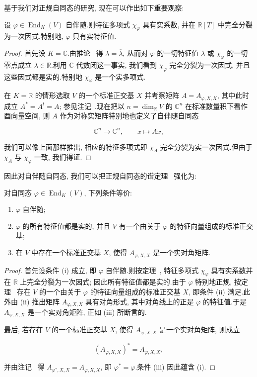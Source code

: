 基于我们对正规自同态的研究, 现在可以作出如下重要观察:

\begin{theorem}\label{thm:7.6.3}
设 $\varphi \in \operatorname{End}_K(V)$ 自伴随.则特征多项式 $\chi_\varphi$ 具有实系数, 并在 $\mathbb{R}[T]$ 中完全分裂为一次因式.特别地, $\varphi$ 只有实特征值.
\end{theorem}

\begin{proof}
首先设 $K = \mathbb{C}$.由推论~ 得 $\lambda = \overline{\lambda}$, 从而对 $\varphi$ 的一切特征值 $\lambda$ 或 $\chi_\varphi$ 的一切零点成立 $\lambda \in \mathbb{R}$.利用 $\mathbb{C}$ 代数闭这一事实, 我们看到 $\chi_\varphi$ 完全分裂为一次因式, 并且这些因式都是实的.特别地 $\chi_\varphi$ 是一个实多项式.

在 $K = \mathbb{R}$ 的情形选取 $V$ 的一个标准正交基 $X$ 并考察矩阵 $A = A_{\varphi, X, X}$, 其中此时成立 $A^* = A^t = A$; 参见注记~.现在把以 $n = \dim_{\mathbb{R}} V$ 的 $\mathbb{C}^n$ 在标准数量积下看作酉向量空间, 则 $A$ 作为对称实矩阵特别地也定义了自伴随自同态

\[
\mathbb{C}^n \longrightarrow \mathbb{C}^n, \qquad x \longmapsto A x,
\]

我们可以像上面那样推出, 相应的特征多项式即 $\chi_A$ 完全分裂为实一次因式.但由于 $\chi_A$ 与 $\chi_\varphi$ 一致, 我们得证.
\end{proof}

因此对自伴随自同态, 我们可以把正规自同态的谱定理~ 强化为:

\begin{corollary}\label{cor:7.6.4}
对自同态 $\varphi \in \operatorname{End}_K(V)$, 下列条件等价:
\begin{enumerate}
\item[(i)] $\varphi$ 自伴随;
\item[(ii)] $\varphi$ 的所有特征值都是实的, 并且 $V$ 有一个由关于 $\varphi$ 的特征向量组成的标准正交基;
\item[(iii)] 在 $V$ 中存在一个标准正交基 $X$, 使得 $A_{\varphi, X, X}$ 是一个实对角矩阵.
\end{enumerate}
\end{corollary}

\begin{proof}
首先设条件 (i) 成立, 即 $\varphi$ 自伴随.则按定理~, 特征多项式 $\chi_\varphi$ 具有实系数并在 $\mathbb{R}$ 上完全分裂为一次因式; 因此所有特征值都是实的.由于 $\varphi$ 特别地正规, 按定理~ 存在 $V$ 的一个由关于 $\varphi$ 的特征向量组成的标准正交基 $X$, 即条件 (ii) 满足.此外由 (ii) 推出矩阵 $A_{\varphi, X, X}$ 具有对角形式, 其中对角线上的正是 $\varphi$ 的特征值.于是 $A_{\varphi, X, X}$ 是一个实对角矩阵, 正如 (iii) 所断言的.

最后, 若存在 $V$ 的一个标准正交基 $X$, 使得 $A_{\varphi, X, X}$ 是一个实对角矩阵, 则成立

\[
(A_{\varphi, X, X})^* = A_{\varphi, X, X},
\]

并由注记~ 得 $A_{\varphi^*, X, X} = A_{\varphi, X, X}$, 即 $\varphi^* = \varphi$.条件 (iii) 因此蕴含 (i).
\end{proof}

